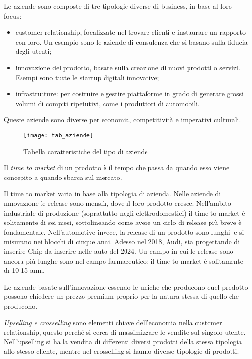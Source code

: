 Le aziende sono composte di tre tipologie diverse di business, in base al loro
focus:
\begin{itemize}
\item customer relationship, focalizzate nel trovare clienti e instaurare un
rapporto con loro. Un esempio sono le aziende di consulenza che si basano sulla
fiducia degli utenti;
\item innovazione del prodotto, basate sulla creazione di nuovi prodotti o
servizi. Esempi sono tutte le startup digitali innovative;
\item infrastrutture: per costruire e gestire piattaforme in grado di generare
grossi volumi di compiti ripetutivi, come i produttori di automobili.
\end{itemize}
Queste aziende sono diverse per economia, competitività e imperativi culturali.

\begin{figure}[t]
 \centering
 \texttt{[image: tab\_aziende]}
 \caption{Tabella caratteristiche del tipo di aziende}
 \label{fig:bmi:tab_aziende}
\end{figure}

\begin{definition}
Il \textit{time to market} di un prodotto è il tempo che passa da quando esso
viene concepito a quando sbarca sul mercato.
\end{definition}

Il time to market varia in base alla tipologia di azienda. Nelle aziende di
innovazione le release sono mensili, dove il loro prodotto cresce. Nell'ambito
industriale di produzione (soprattutto negli elettrodomestici) il time to
market è solitamente di sei mesi, sottolineando come avere un ciclo di release
più breve è fondamentale. Nell'automotive invece, la release di un prodotto
sono lunghi, e si misurano nei blocchi di cinque anni. Adesso nel 2018, Audi,
sta progettando di inserire Chip da inserire nelle auto del 2024. Un campo in
cui le release sono ancora più lunghe sono nel campo farmaceutico: il time to
market è solitamente di 10-15 anni.

Le aziende basate sull'innovazione essendo le uniche che producono quel
prodotto possono chiedere un prezzo premium proprio per la natura stessa di
quello che producono.

\textit{Upselling e crosselling} sono elementi chiave dell'economia nella
customer relationship, questo perché si cerca di massimizzare le vendite sul
singolo utente. Nell'upselling si ha la vendita di differenti diversi prodotti
della stessa tipologia allo stesso cliente, mentre nel crosselling si hanno
diverse tipologie di prodotti.


